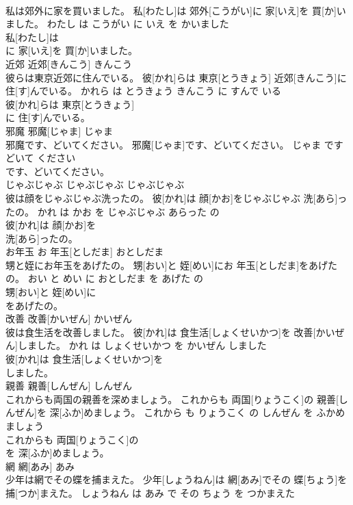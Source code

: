 \documentclass[8pt]{extreport}
\begin{document}
\begin{CJK}{UTF8}{min}
\\	私は郊外に家を買いました。	私[わたし]は 郊外[こうがい]に 家[いえ]を 買[か]いました。	わたし は こうがい に いえ を かいました	
\\	私[わたし]は
\\	に 家[いえ]を 買[か]いました。			
\\	近郊	近郊[きんこう]	きんこう	
\\	彼らは東京近郊に住んでいる。	彼[かれ]らは 東京[とうきょう] 近郊[きんこう]に 住[す]んでいる。	かれら は とうきょう きんこう に すんで いる	
\\	彼[かれ]らは 東京[とうきょう]
\\	に 住[す]んでいる。			
\\	邪魔	邪魔[じゃま]	じゃま	
\\	邪魔です、どいてください。	邪魔[じゃま]です、どいてください。	じゃま です どいて ください	
\\	です、どいてください。			
\\	じゃぶじゃぶ	じゃぶじゃぶ	じゃぶじゃぶ	
\\	彼は顔をじゃぶじゃぶ洗ったの。	彼[かれ]は 顔[かお]をじゃぶじゃぶ 洗[あら]ったの。	かれ は かお を じゃぶじゃぶ あらった の	
\\	彼[かれ]は 顔[かお]を
\\	洗[あら]ったの。			
\\	お年玉	お 年玉[としだま]	おとしだま	
\\	甥と姪にお年玉をあげたの。	甥[おい]と 姪[めい]にお 年玉[としだま]をあげたの。	おい と めい に おとしだま を あげた の	
\\	甥[おい]と 姪[めい]に
\\	をあげたの。			
\\	改善	改善[かいぜん]	かいぜん	
\\	彼は食生活を改善しました。	彼[かれ]は 食生活[しょくせいかつ]を 改善[かいぜん]しました。	かれ は しょくせいかつ を かいぜん しました	
\\	彼[かれ]は 食生活[しょくせいかつ]を
\\	しました。			
\\	親善	親善[しんぜん]	しんぜん	
\\	これからも両国の親善を深めましょう。	これからも 両国[りょうこく]の 親善[しんぜん]を 深[ふか]めましょう。	これから も りょうこく の しんぜん を ふかめましょう	
\\	これからも 両国[りょうこく]の
\\	を 深[ふか]めましょう。			
\\	網	網[あみ]	あみ	
\\	少年は網でその蝶を捕まえた。	少年[しょうねん]は 網[あみ]でその 蝶[ちょう]を 捕[つか]まえた。	しょうねん は あみ で その ちょう を つかまえた	

\end{CJK}
\end{document}
